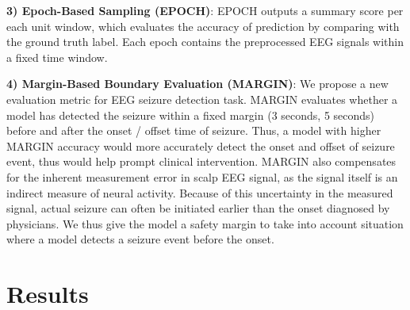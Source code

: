 \documentclass[pmlr,twocolumn,10pt]{jmlr}
\begin{document}
\noindent\textbf{3) Epoch-Based Sampling (EPOCH)}: EPOCH outputs a summary score per each unit window, which evaluates the accuracy of prediction by comparing with the ground truth label. Each epoch contains the preprocessed EEG signals within a fixed time window.

\noindent\textbf{4) Margin-Based Boundary Evaluation (MARGIN)}: We propose a new evaluation metric for EEG seizure detection task. MARGIN evaluates whether a model has detected the seizure within a fixed margin (3 seconds, 5 seconds) before and after the onset / offset time of seizure. Thus, a model with higher MARGIN accuracy would more accurately detect the onset and offset of seizure event, thus would help prompt clinical intervention. MARGIN also compensates for the inherent measurement error in scalp EEG signal, as the signal itself is an indirect measure of neural activity. Because of this uncertainty in the measured signal, actual seizure can often be initiated earlier than the onset diagnosed by physicians. We thus give the model a safety margin to take into account situation where a model detects a seizure event before the onset. \section{Results}
\label{sec:results}
\end{document}

